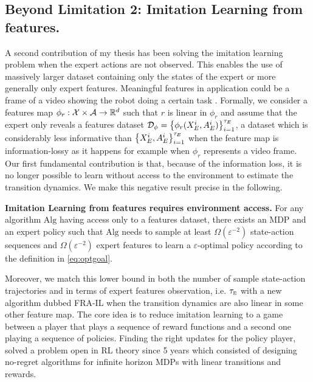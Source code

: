 \documentclass{article}
\begin{document}
\subsection{Beyond Limitation 2: Imitation Learning from features.}
A second contribution of my thesis has been solving the imitation learning problem when the expert actions are not observed.
This enables the use of massively larger dataset containing only the states of the expert or more generally only expert features.
Meaningful features in application could be a frame of a video showing the robot doing a certain task \citep{torabi2018behavioral}.
Formally, we consider a features map $\phi_r: \mathcal{X}\times\mathcal{A} \rightarrow \mathbb{R}^d$ such that $r$ is linear in $\phi_r$ and assume that the expert only reveals a features dataset $\mathcal{D}_{\phi} = \left\{{\phi_r(X^i_E, A^i_E)}\right\}^{\tau_E}_{i=1}$,
a dataset which is considerably less informative than $\left\{{X^i_E, A^i_E}\right\}^{\tau_E}_{i=1}$ when the feature map is information-lossy as it happens for example when $\phi_r$ represents a video frame.
Our first fundamental contribution is that, because of the information loss, it is no longer possible to learn 
without access to the environment to estimate the transition dynamics.
We make this negative result precise in the following.
\begin{tcolorbox}[
    colback=orange!10!white,
    colframe=orange!80!black,
    width=\linewidth
  ]
\begin{theorem} \textbf{Imitation Learning from features requires environment access. }
    For any algorithm $\mathrm{Alg}$ having access only to a features dataset, there exists an MDP and an expert policy such that $\mathrm{Alg}$ needs to sample at least $\Omega(\varepsilon^{-2})$   
    state-action sequences and $\Omega(\varepsilon^{-2})$ expert features to learn a $\varepsilon$-optimal policy according to the definition in \eqref{eq:optgoal}.
\end{theorem}
\end{tcolorbox}
Moreover, we match this lower bound in both the number of sample state-action trajectories and in terms of expert features observation, i.e. $\tau_{\scriptscriptstyle\textup{E}}$ with a new algorithm
dubbed FRA-IL \citep{moulin2025optimistically} when the transition dynamics are also linear in some other feature map.
The core idea is to reduce imitation learning to a game between a player that plays a sequence of reward functions and a second one playing a sequence of policies.
Finding the right updates for the policy player, solved a problem open in RL theory since 5 years \citep{jin2019provably} which consisted of designing no-regret algorithms for infinite horizon MDPs with linear transitions and rewards.
\end{document}
